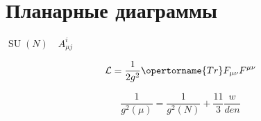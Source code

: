 \section{Планарные диаграммы}

$ \operatorname{SU}(N) \quad A^i_{\mu j} $

$$
\mathcal{L} = \frac{1}{2g^2}\opertorname{Tr}F_{\mu \nu}F^{\mu \nu}
$$

 $$ \frac{1}{g^2(\mu)} = \frac{1}{g^2(N)} + \frac{11}{3}\frac{w}{den}$$